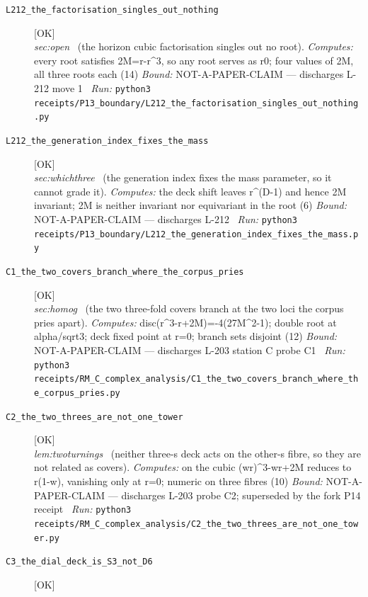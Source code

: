 \begin{description}
\item[\label{rcpt:L212_the_factorisation_singles_out_nothing}\texttt{L212\_the\_factorisation\_singles\_out\_nothing}]\hfill\textsf{[OK]}\\
\textit{sec:open} \ (the horizon cubic factorisation singles out no root). 
\emph{Computes:} every root satisfies 2M=r-r\textasciicircum{}3, so any root serves as r0; four values of 2M, all three roots each (14)
 \emph{Bound:} NOT-A-PAPER-CLAIM --- discharges L-212 move 1
\ \emph{Run:} \texttt{python3 receipts/P13\_boundary/L212\_the\_factorisation\_singles\_out\_nothing.py}
\item[\label{rcpt:L212_the_generation_index_fixes_the_mass}\texttt{L212\_the\_generation\_index\_fixes\_the\_mass}]\hfill\textsf{[OK]}\\
\textit{sec:whichthree} \ (the generation index fixes the mass parameter, so it cannot grade it). 
\emph{Computes:} the deck shift leaves r\textasciicircum{}(D-1) and hence 2M invariant; 2M is neither invariant nor equivariant in the root (6)
 \emph{Bound:} NOT-A-PAPER-CLAIM --- discharges L-212
\ \emph{Run:} \texttt{python3 receipts/P13\_boundary/L212\_the\_generation\_index\_fixes\_the\_mass.py}
\item[\label{rcpt:C1_the_two_covers_branch_where_the_corpus_pries}\texttt{C1\_the\_two\_covers\_branch\_where\_the\_corpus\_pries}]\hfill\textsf{[OK]}\\
\textit{sec:homog} \ (the two three-fold covers branch at the two loci the corpus pries apart). 
\emph{Computes:} disc(r\textasciicircum{}3-r+2M)=-4(27M\textasciicircum{}2-1); double root at alpha/sqrt3; deck fixed point at r=0; branch sets disjoint (12)
 \emph{Bound:} NOT-A-PAPER-CLAIM --- discharges L-203 station C probe C1
\ \emph{Run:} \texttt{python3 receipts/RM\_C\_complex\_analysis/C1\_the\_two\_covers\_branch\_where\_the\_corpus\_pries.py}
\item[\label{rcpt:C2_the_two_threes_are_not_one_tower}\texttt{C2\_the\_two\_threes\_are\_not\_one\_tower}]\hfill\textsf{[OK]}\\
\textit{lem:twoturnings} \ (neither three-s deck acts on the other-s fibre, so they are not related as covers). 
\emph{Computes:} on the cubic (wr)\textasciicircum{}3-wr+2M reduces to r(1-w), vanishing only at r=0; numeric on three fibres (10)
 \emph{Bound:} NOT-A-PAPER-CLAIM --- discharges L-203 probe C2; superseded by the fork P14 receipt
\ \emph{Run:} \texttt{python3 receipts/RM\_C\_complex\_analysis/C2\_the\_two\_threes\_are\_not\_one\_tower.py}
\item[\label{rcpt:C3_the_dial_deck_is_S3_not_D6}\texttt{C3\_the\_dial\_deck\_is\_S3\_not\_D6}]\hfill\textsf{[OK]}\\

\end{description}
